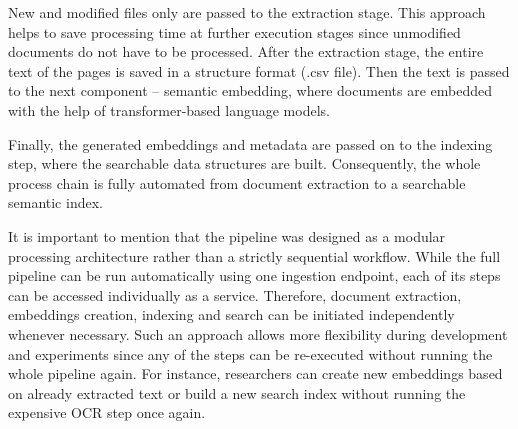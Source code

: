 New and modified files only are passed to the extraction stage. This approach helps to save processing time at further execution stages since unmodified documents do not have to be processed. After the extraction stage, the entire text of the pages is saved in a structure format (.csv file). Then the text is passed to the next component – semantic embedding, where documents are embedded with the help of transformer-based language models.

Finally, the generated embeddings and metadata are passed on to the indexing step, where the searchable data structures are built. Consequently, the whole process chain is fully automated from document extraction to a searchable semantic index.

It is important to mention that the pipeline was designed as a modular processing architecture rather than a strictly sequential workflow. While the full pipeline can be run automatically using one ingestion endpoint, each of its steps can be accessed individually as a service. Therefore, document extraction, embeddings creation, indexing and search can be initiated independently whenever necessary. Such an approach allows more flexibility during development and experiments since any of the steps can be re-executed without running the whole pipeline again. For instance, researchers can create new embeddings based on already extracted text or build a new search index without running the expensive OCR step once again.


